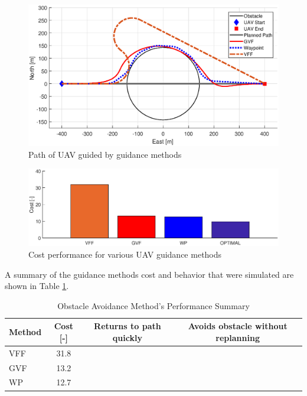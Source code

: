 \documentclass[conf]{new-aiaa}
\begin{document}
\begin{figure}[H]
	\centering
	\includegraphics[trim=0 50 0 65,clip,width=15cm]{Figures/Simulations/compareMethods}
	\caption{Path of UAV guided by guidance methods}
	\label{fig:comparemethods}
\end{figure}


\begin{figure}[H]
	\centering
	\label{fig:barPlotCost}
	\includegraphics[width=15cm]{Figures/Simulations/barPlotPerformance}
	\caption{Cost performance for various UAV guidance methods}
	\label{fig:barplotperformance}
\end{figure}

A summary of the guidance methods cost and behavior that were simulated are shown in Table \ref{table}.

\begin{table}[H]
	\centering
	\caption{Obstacle Avoidance Method's Performance Summary }
	\label{table}
	\begin{tabular}{|l|c|c|c|}
		\hline
		\multicolumn{1}{|c|}{Method} & Cost {[}-{]} & Returns to path quickly & Avoids obstacle without replanning \\ \hline
		VFF                          & 31.8         &                         & \Checkmark
		\\ \hline
		GVF                          & 13.2         & \Checkmark                       & \Checkmark                                  \\ \hline
		WP                           & 12.7         & \Checkmark                       &                                    \\ \hline
	\end{tabular}
\end{table}
\end{document}
